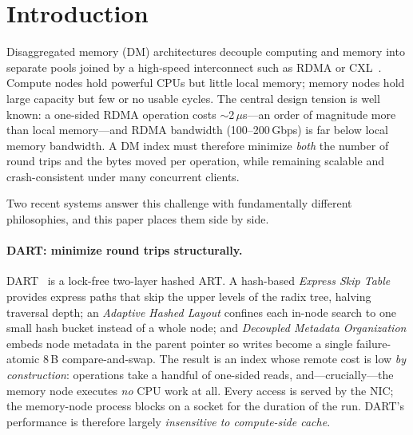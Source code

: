 \documentclass[sigconf,nonacm]{acmart}
\begin{document}

\maketitle

\section{Introduction}
Disaggregated memory (DM) architectures decouple computing and memory into
separate pools joined by a high-speed interconnect such as RDMA or
CXL~\cite{dart,smart,sherman}. Compute nodes hold powerful CPUs but little
local memory; memory nodes hold large capacity but few or no usable cycles. The
central design tension is well known: a one-sided RDMA operation costs
$\sim$2\,$\mu$s---an order of magnitude more than local memory---and RDMA
bandwidth (100--200\,Gbps) is far below local memory bandwidth. A DM index must
therefore minimize \emph{both} the number of round trips and the bytes moved per
operation, while remaining scalable and crash-consistent under many concurrent
clients.

Two recent systems answer this challenge with fundamentally different
philosophies, and this paper places them side by side.

\paragraph{DART: minimize round trips structurally.}
DART~\cite{dart} is a lock-free two-layer hashed ART. A hash-based
\emph{Express Skip Table} provides express paths that skip the upper levels of
the radix tree, halving traversal depth; an \emph{Adaptive Hashed Layout}
confines each in-node search to one small hash bucket instead of a whole node;
and \emph{Decoupled Metadata Organization} embeds node metadata in the parent
pointer so writes become a single failure-atomic 8\,B compare-and-swap. The
result is an index whose remote cost is low \emph{by construction}: operations
take a handful of one-sided reads, and---crucially---the memory node executes
\emph{no} CPU work at all. Every access is served by the NIC; the memory-node
process blocks on a socket for the duration of the run. DART's performance is
therefore largely \emph{insensitive to compute-side cache}.
\end{document}
